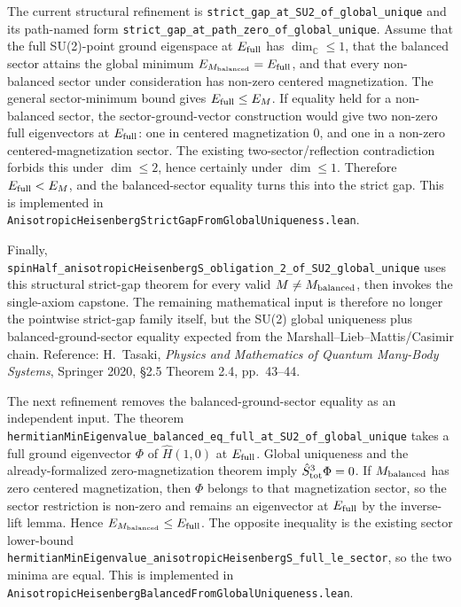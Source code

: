\documentclass[a4paper,11pt]{article}
\begin{document}
The current structural refinement is
\texttt{strict\_gap\_at\_SU2\_of\_global\_unique} and its path-named form
\texttt{strict\_gap\_at\_path\_zero\_of\_global\_unique}.  Assume that the full
SU(2)-point ground eigenspace at \(E_{\rm full}\) has
\(\dim_{\mathbb C}\le1\), that the balanced sector attains the global minimum
\(E_{M_{\rm balanced}}=E_{\rm full}\), and that every non-balanced sector under
consideration has non-zero centered magnetization.  The general sector-minimum
bound gives \(E_{\rm full}\le E_M\).  If equality held for a non-balanced
sector, the sector-ground-vector construction would give two non-zero full
eigenvectors at \(E_{\rm full}\): one in centered magnetization \(0\), and one
in a non-zero centered-magnetization sector.  The existing two-sector/reflection
contradiction forbids this under \(\dim\le2\), hence certainly under
\(\dim\le1\).  Therefore \(E_{\rm full}<E_M\), and the balanced-sector equality
turns this into the strict gap.  This is implemented in
\texttt{AnisotropicHeisenbergStrictGapFromGlobalUniqueness.lean}.

Finally,
\texttt{spinHalf\_anisotropicHeisenbergS\_obligation\_2\_of\_SU2\_global\_unique}
uses this structural strict-gap theorem for every valid \(M\ne
M_{\rm balanced}\), then invokes the single-axiom capstone.  The remaining
mathematical input is therefore no longer the pointwise strict-gap family
itself, but the SU(2) global uniqueness plus balanced-ground-sector equality
expected from the Marshall--Lieb--Mattis/Casimir chain.  Reference: H.~Tasaki,
\emph{Physics and Mathematics of Quantum Many-Body Systems}, Springer 2020,
§2.5 Theorem 2.4, pp.~43--44.

The next refinement removes the balanced-ground-sector equality as an
independent input.  The theorem
\texttt{hermitianMinEigenvalue\_balanced\_eq\_full\_at\_SU2\_of\_global\_unique}
takes a full ground eigenvector \(\Phi\) of \(\hat H(1,0)\) at
\(E_{\rm full}\).  Global uniqueness and the already-formalized
zero-magnetization theorem imply
\(\hat S^3_{\rm tot}\Phi=0\).  If \(M_{\rm balanced}\) has zero centered
magnetization, then \(\Phi\) belongs to that magnetization sector, so the
sector restriction is non-zero and remains an eigenvector at \(E_{\rm full}\)
by the inverse-lift lemma.  Hence \(E_{M_{\rm balanced}}\le E_{\rm full}\).
The opposite inequality is the existing sector lower-bound
\texttt{hermitianMinEigenvalue\_anisotropicHeisenbergS\_full\_le\_sector},
so the two minima are equal.  This is implemented in
\texttt{AnisotropicHeisenbergBalancedFromGlobalUniqueness.lean}.
\end{document}
